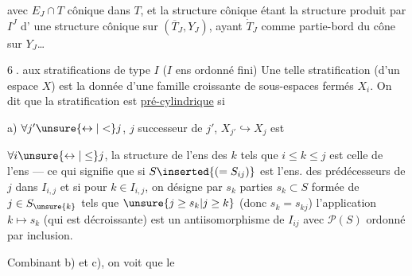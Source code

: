 avec $E_J\cap T$ cônique dans $T$, et la structure cônique
 étant la structure produit par $I^J$ d'
une structure cônique sur $(\overline T_J,Y_J)$, ayant
$\dot T_J$ comme partie-bord du cône sur $Y_J$\ldots


\textcircled{6.}  aux stratifications de type $I$
($I$ ens ordonné fini)
Une telle stratification (d'un espace $X$) est
la donnée d'une famille croissante de
sous-espaces fermés $X_i$. On dit que
la stratification est \uline{pré-cylindrique} si

a) $\forall j'\unsure{\leftrightarrow|<}j$, $j$ successeur de $j'$,
$X_{j'}\hookrightarrow X_j$ est
 



$\forall i\unsure{\leftrightarrow|\le}j$, la structure de l'ens 
des $k$ tels que $i\le k\le j$ est celle de l'ens
  --- ce qui signifie que
si $S\inserted{(=S_{ij})}$ est l'ens. des prédécesseurs de $j$ dans
$I_{i,j}$ 
et si pour $k\in I_{i,j}$, on désigne
 par $s_k$  parties $s_k\subset S$ formée
de $j\in S_{\unsure{k}}$ tels que
$\unsure{j\ge s_k|j\ge k}$ (donc $s_k=s_{kj}$)
l'application $k\longmapsto s_k$ (qui est décroissante)
est un antiisomorphisme de $I_{ij}$ avec $\mathcal P(S)$
ordonné par inclusion. 




Combinant b) et c), on voit que le
